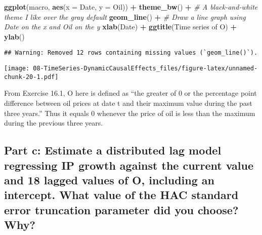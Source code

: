 \documentclass[
]{article}
\newenvironment{Shaded}{\begin{snugshade}}{\end{snugshade}}
\newcommand{\AttributeTok}[1]{\textcolor[rgb]{0.13,0.29,0.53}{#1}}
\newcommand{\CommentTok}[1]{\textcolor[rgb]{0.56,0.35,0.01}{\textit{#1}}}
\newcommand{\FunctionTok}[1]{\textcolor[rgb]{0.13,0.29,0.53}{\textbf{#1}}}
\newcommand{\NormalTok}[1]{#1}
\newcommand{\SpecialCharTok}[1]{\textcolor[rgb]{0.81,0.36,0.00}{\textbf{#1}}}
\newcommand{\StringTok}[1]{\textcolor[rgb]{0.31,0.60,0.02}{#1}}
\begin{document}
\begin{Shaded}
\begin{Highlighting}[]
\FunctionTok{ggplot}\NormalTok{(macro, }\FunctionTok{aes}\NormalTok{(}\AttributeTok{x =}\NormalTok{ Date, }\AttributeTok{y =}\NormalTok{ Oil)) }\SpecialCharTok{+}
  \FunctionTok{theme\_bw}\NormalTok{() }\SpecialCharTok{+} \CommentTok{\# A black{-}and{-}white theme I like over the gray default}
  \FunctionTok{geom\_line}\NormalTok{() }\SpecialCharTok{+} \CommentTok{\# Draw a line graph using Date on the x and Oil on the y}
  \FunctionTok{xlab}\NormalTok{(}\StringTok{\textquotesingle{}Date\textquotesingle{}}\NormalTok{) }\SpecialCharTok{+} \FunctionTok{ggtitle}\NormalTok{(}\StringTok{\textquotesingle{}Time series of O\textquotesingle{}}\NormalTok{) }\SpecialCharTok{+} \FunctionTok{ylab}\NormalTok{(}\StringTok{\textquotesingle{}\textquotesingle{}}\NormalTok{)}
\end{Highlighting}
\end{Shaded}

\begin{verbatim}
## Warning: Removed 12 rows containing missing values (`geom_line()`).
\end{verbatim}

\texttt{[image: 08-TimeSeries-DynamicCausalEffects\_files/figure-latex/unnamed-chunk-20-1.pdf]}

From Exercise 16.1, O here is defined as ``the greater of 0 or the
percentage point difference between oil prices at date t and their
maximum value during the past three years.'' Thus it equals 0 whenever
the price of oil is less than the maximum during the previous three
years.

\hypertarget{part-c-estimate-a-distributed-lag-model-regressing-ip-growth-against-the-current-value-and-18-lagged-values-of-o-including-an-intercept.-what-value-of-the-hac-standard-error-truncation-parameter-did-you-choose-why}{%
\subsection{Part c: Estimate a distributed lag model regressing IP
growth against the current value and 18 lagged values of O, including an
intercept. What value of the HAC standard error truncation parameter did
you choose?
Why?}\label{part-c-estimate-a-distributed-lag-model-regressing-ip-growth-against-the-current-value-and-18-lagged-values-of-o-including-an-intercept.-what-value-of-the-hac-standard-error-truncation-parameter-did-you-choose-why}}
\end{document}
